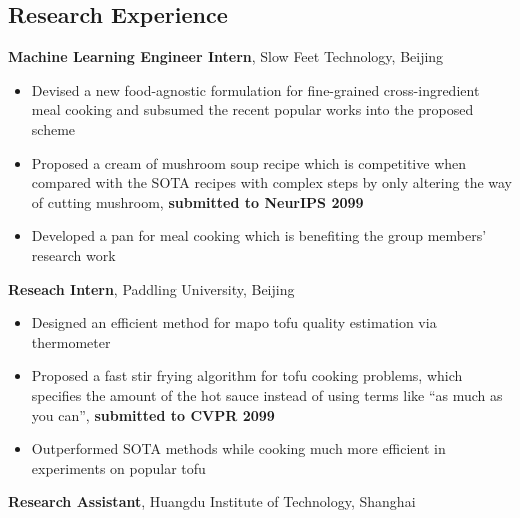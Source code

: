 \documentclass[
]{article}
\providecommand{\tightlist}{%
  \setlength{\itemsep}{0pt}\setlength{\parskip}{0pt}}
\begin{document}
\hypertarget{research-experience}{%
\subsection{Research Experience}\label{research-experience}}

\begin{description}
\tightlist
\item[07/2021 - Present]
\textbf{Machine Learning Engineer Intern}, Slow Feet Technology, Beijing
\end{description}

\begin{itemize}
\tightlist
\item
  Devised a new food-agnostic formulation for fine-grained
  cross-ingredient meal cooking and subsumed the recent popular works
  into the proposed scheme
\item
  Proposed a cream of mushroom soup recipe which is competitive when
  compared with the SOTA recipes with complex steps by only altering the
  way of cutting mushroom, \textbf{submitted to NeurIPS 2099}
\item
  Developed a pan for meal cooking which is benefiting the group
  members' research work
\end{itemize}

\begin{description}
\tightlist
\item[08/2020 - Present]
\textbf{Reseach Intern}, Paddling University, Beijing
\end{description}

\begin{itemize}
\tightlist
\item
  Designed an efficient method for mapo tofu quality estimation via
  thermometer
\item
  Proposed a fast stir frying algorithm for tofu cooking problems, which
  specifies the amount of the hot sauce instead of using terms like ``as
  much as you can'', \textbf{submitted to CVPR 2099}
\item
  Outperformed SOTA methods while cooking much more efficient in
  experiments on popular tofu
\end{itemize}

\begin{description}
\tightlist
\item[03/2020 - 06/2020]
\textbf{Research Assistant}, Huangdu Institute of Technology, Shanghai
\end{description}
\end{document}

